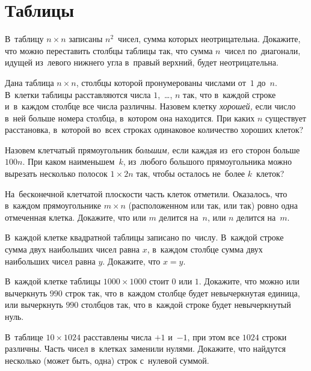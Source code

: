
\section*{Таблицы}


\begin{problems}

\item
В~таблицу $n \times n$ записаны $n^2$~чисел, сумма которых неотрицательна.
Докажите, что можно переставить столбцы таблицы так, что сумма $n$~чисел
по~диагонали, идущей из~левого нижнего угла в~правый верхний, будет
неотрицательна.

\item
Дана таблица $n \times n$, столбцы которой пронумерованы числами от~$1$ до~$n$.
В~клетки таблицы расставляются числа $1$,~\ldots, $n$ так, что в~каждой строке
и~в~каждом столбце все числа различны.
Назовем клетку \emph{хорошей,} если число в~ней больше номера столбца,
в~котором она находится.
При каких $n$ существует расстановка, в~которой во~всех строках одинаковое
количество хороших клеток?

\item
Назовем клетчатый прямоугольник \emph{большим,} если каждая из~его сторон
больше $100 n$.
При каком наименьшем~$k$, из~любого большого прямоугольника можно вырезать
несколько полосок $1 \times 2 n$ так, чтобы осталось не~более $k$~клеток?

\item
На~бесконечной клетчатой плоскости часть клеток отметили.
Оказалось, что в~каждом прямоугольнике $m \times n$
(расположенном или так, или так) ровно одна отмеченная клетка.
Докажите, что или $m$ делится на~$n$, или $n$ делится на~$m$.

\item
В~каждой клетке квадратной таблицы записано по~числу.
В~каждой строке сумма двух наибольших чисел равна $x$, в~каждом столбце сумма
двух наибольших чисел равна $y$.
Докажите, что $x = y$.

\item
В~каждой клетке таблицы $1000 \times 1000$ стоит $0$ или $1$.
Докажите, что можно или вычеркнуть $990$ строк так, что в~каждом столбце будет
невычеркнутая единица, или вычеркнуть $990$ столбцов так, что в~каждой строке
будет невычеркнутый нуль.

\item
В~таблице $10 \times 1024$ расставлены числа $+1$ и~$-1$, при этом все
$1024$ строки различны.
Часть чисел в~клетках заменили нулями.
Докажите, что найдутся несколько (может быть, одна) строк с~нулевой суммой.

\end{problems}

